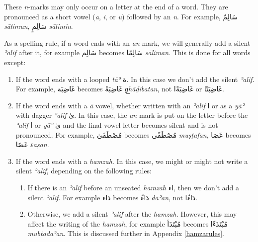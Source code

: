 \documentclass[
  10pt,
]{book}
\begin{document}
These \emph{n}-marks may only occur on a letter at the end of a word. They are pronounced as a short vowel (\emph{a}, \emph{i}, or \emph{u}) followed by an \emph{n}. For example, \foreignlanguage{arabic}{سَالِمٌ} \emph{sālimun}, \foreignlanguage{arabic}{سَالِمٍ} \emph{sālimin}.

As a spelling rule, if a word ends with an \emph{an} mark, we will generally add a silent \emph{ʾalif} after it, for example \foreignlanguage{arabic}{سَالِم} becomes \foreignlanguage{arabic}{سَالِمًا} \emph{sāliman}. This is done for all words except:

\begin{enumerate}
\def\labelenumi{\arabic{enumi}.}
\item
  If the word ends with a looped \emph{tāʾ} \foreignlanguage{arabic}{ة}. In this case we don't add the silent \emph{ʾalif}. For example, \foreignlanguage{arabic}{غَاضِبَة} becomes \foreignlanguage{arabic}{غَاضِبَةً} \emph{g͟hāḍibatan}, not \foreignlanguage{arabic}{غَاضِبَةًا} or \foreignlanguage{arabic}{غَاضِبَتًا}.
\item
  If the word ends with a \emph{ā} vowel, whether written with an \emph{ʾalif} \foreignlanguage{arabic}{ا} or as a \emph{yāʾ} with dagger \emph{ʾalif} \foreignlanguage{arabic}{ىٰ}. In this case, the \emph{an} mark is put on the letter before the \emph{ʾalif} \foreignlanguage{arabic}{ا} or \emph{yāʾ} \foreignlanguage{arabic}{ىٰ} and the final vowel letter becomes silent and is not pronounced. For example, \foreignlanguage{arabic}{مُصْطَفَىٰ} becomes \foreignlanguage{arabic}{مُصْطَفًى} \emph{muṣṭafan}, \foreignlanguage{arabic}{عَصَا} becomes \foreignlanguage{arabic}{عَصًا} \emph{ɛaṣan}.
\item
  If the word ends with a \emph{hamzah}. In this case, we might or might not write a silent \emph{ʾalif}, depending on the following rules:

  \begin{enumerate}
  \def\labelenumii{\alph{enumii}.}
  \item
    If there is an \emph{ʾalif} before an unseated \emph{hamzah} \foreignlanguage{arabic}{اء}, then we don't add a silent \emph{ʾalif}. For example \foreignlanguage{arabic}{دَاء} becomes \foreignlanguage{arabic}{دَاءً} \emph{dāʾan}, not \foreignlanguage{arabic}{دَاءًا}.
  \item
    Otherwise, we add a silent \emph{ʾalif} after the \emph{hamzah}. However, this may affect the writing of the \emph{hamzah}, for example \foreignlanguage{arabic}{مُبْتَدَأ} becomes \foreignlanguage{arabic}{مُبْتَدَءًا} \emph{mubtadaʾan}. This is discussed further in Appendix \ref{hamzarules}.
  \end{enumerate}
\end{enumerate}
\end{document}
